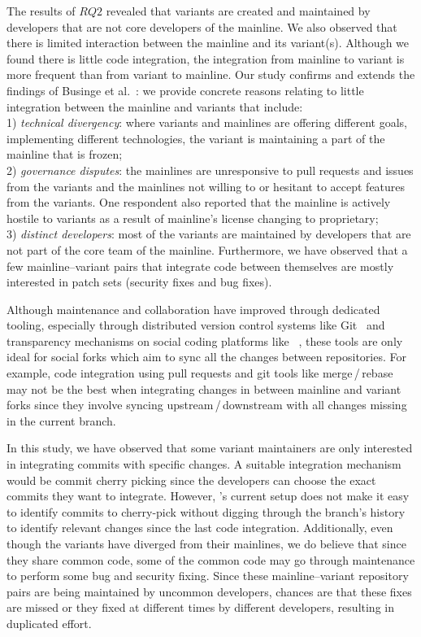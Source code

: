 The results of $RQ2$ revealed that variants are created and maintained by developers that are not core developers of the mainline.
We also observed that there is limited interaction between the mainline and its variant(s).
Although we found there is little code integration, the integration from mainline to variant is more frequent than from variant to  mainline.
Our study confirms and extends the findings of Businge et al.~\cite{businge:emse:2021}: we provide concrete reasons relating to little integration between the mainline and variants that include:\\
1) \textit{technical divergency}: where variants and mainlines are offering different goals, implementing different technologies, the variant is maintaining a part of the mainline that is frozen;\\
2) \textit{governance disputes}: the mainlines are unresponsive to pull requests and issues from the variants and the mainlines not willing to or hesitant to accept features from the variants. One respondent also reported that the mainline is actively hostile to variants as a result of mainline's license changing to proprietary;\\
3) \textit{distinct developers}: most of the variants are maintained by developers that are not part of the core team of the mainline.
Furthermore, we have observed that a few mainline--variant pairs that integrate code between themselves are mostly interested in patch sets (security fixes and bug fixes).

Although maintenance and collaboration have improved through dedicated tooling, especially through distributed version
control systems like Git~\cite{Christian:MSR:2012} and transparency mechanisms on social coding platforms like \gh~\cite{Laura:2012:CSCW}, these tools are only ideal for social forks which aim to sync all the changes between repositories.
For example, code integration using pull requests and \textsf{git} tools like  \textsf{merge\,/\,rebase} may not be the best when integrating changes in between mainline and variant forks since they involve syncing upstream\,/\,downstream with all changes missing in the current branch.

In this study, we have observed that some variant maintainers are only interested in integrating commits with specific changes.
A suitable integration mechanism would be commit cherry picking since the developers can choose the exact commits they want to integrate.
However, \gh's current setup does not make it easy to identify commits to cherry-pick without digging through the branch's history to identify relevant changes since the last code integration.
Additionally, even though the variants have diverged from their mainlines, we do believe that since they share common code, some of the common code may go through maintenance to perform some bug and security fixing.
Since these mainline--variant repository pairs are being maintained by uncommon developers, chances are that these fixes are missed or they fixed at different times by different developers, resulting in duplicated effort.

